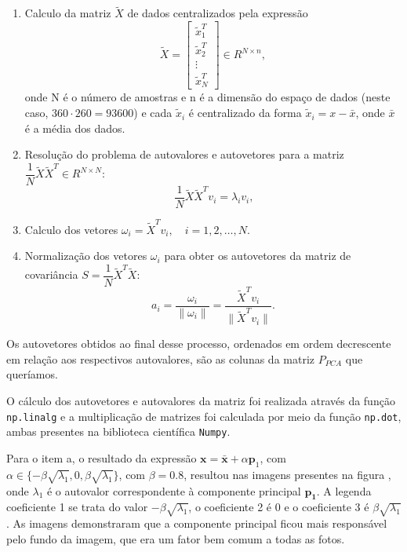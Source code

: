 \documentclass[a4paper, 11pt]{article}
\begin{document}
\begin{enumerate}
    \item Calculo da matriz $\tilde{X}$ de dados centralizados pela expressão \[\tilde{X} = \begin{bmatrix}
    \tilde{x}_1^T \\
    \tilde{x}_2^T \\
    \vdots \\
    \tilde{x}_N^T
    \end{bmatrix}
    \in {R}^{N \times n},\]
    onde N é o número de amostras e n é a dimensão do espaço de dados (neste caso, $360 \cdot 260=93600$) e cada $\tilde{x}_i$ é centralizado da forma $\tilde{x}_i=x-\bar{x}$, onde $\bar{x}$ é a média dos dados.
    \item Resolução do problema de autovalores e autovetores para a matriz $\dfrac{1}{N} \tilde{X} \tilde{X}^T \in {R}^{N \times N}$:
    \[
    \ \dfrac{1}{N}\tilde{X} \tilde{X}^T v_i = \lambda_i v_i,
    \]
    \item Calculo dos vetores $\omega_i = \tilde{X}^T v_i, \quad i = 1, 2, \dots, N.$
    \item Normalização dos vetores $\omega_i$ para obter os autovetores da matriz de covariância $S = \dfrac{1}{N} \tilde{X}^T \tilde{X}$:
    \[
    a_i = \frac{\omega_i}{\|\omega_i\|} = \frac{\tilde{X}^T v_i}{\|\tilde{X}^T v_i\|}.
    \]
\end{enumerate}

Os autovetores obtidos ao final desse processo, ordenados em ordem decrescente em relação aos respectivos autovalores, são as colunas da matriz $P_{PCA}$ que queríamos. 

O cálculo dos autovetores e autovalores da matriz foi realizada através da função \texttt{np.linalg} e a multiplicação de matrizes foi calculada por meio da função \texttt{np.dot}, ambas presentes na biblioteca científica \texttt{Numpy}.

Para o item a, o resultado da expressão $\mathbf{x} = \bar{\mathbf{x}} + \alpha \mathbf{p}_1$, com $\alpha \in \{-\beta\sqrt{\lambda_1}, 0, \beta\sqrt{\lambda_1}\}$, com $\beta=0.8$, resultou nas imagens presentes na figura , onde $\lambda_1$ é o autovalor correspondente à componente principal $\mathbf{p_1}$. A legenda coeficiente 1 se trata do valor $-\beta\sqrt{\lambda_1}$, o coeficiente 2 é 0 e o coeficiente 3 é $\beta\sqrt{\lambda_1}$. As imagens demonstraram que a componente principal ficou mais responsável pelo fundo da imagem, que era um fator bem comum a todas as fotos.
\end{document}
